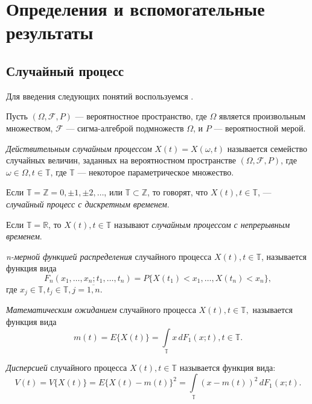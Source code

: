 \newpage
\chapter{Определения и вспомогательные результаты}
\label{c:definitions}

\section{Случайный процесс}

Для введения следующих понятий воспользуемся \cite{brillinjer-ts, trush-ts}.

Пусть $ (\Omega, \mathcal{F}, P) $ --- вероятностное пространство, где $\Omega$ является произвольным множеством, $\mathcal{F}$ --- сигма-алгеброй подмножеств $\Omega$, и $P$ --- вероятностной мерой.

\textit{Действительным случайным процессом} $ X(t) = X(\omega, t) $ называется семейство случайных величин, заданных на вероятностном пространстве $ (\Omega, \mathcal{F}, P) $, где $ \omega \in \Omega, t \in \mathbb{T}$, где $ \mathbb{T} $ --- некоторое параметрическое множество.

Если $ \mathbb{T} = \mathbb{Z} = {0, \pm 1, \pm 2, \dots} $, или $ \mathbb{T} \subset \mathbb{Z} $, то говорят, что $ X(t), t \in \mathbb{T} $, --- \textit{случайный процесс с дискретным временем}.

Если $ \mathbb{T} = \mathbb{R} $, то $ X(t), t \in \mathbb{T} $ называют \textit{случайным процессом с непрерывным временем}.

\textit{n-мерной функцией распределения} случайного процесса $ X(t), t \in \mathbb{T} $, называется функция вида
\begin{equation*}
	F_n(x_1, \dots, x_n; t_1, \dots, t_n) = P \{ X(t_1) < x_1, \dots, X(t_n) < x_n \},
\end{equation*}
где $ x_j \in \mathbb{T}, t_j \in \mathbb{T}, j = \overline{1,n} $.

\textit{Математическим ожиданием} случайного процесса $ X(t), t \in \mathbb{T}, $ называется функция вида
\begin{equation*}
	m(t) = E \{ X(t) \} = \int \limits_{\mathbb{T}} x \, dF_1(x;t), t \in \mathbb{T}.
\end{equation*}

\textit{Дисперсией} случайного процесса $ X(t), t \in \mathbb{T} $ называется функция вида:
\begin{equation*}
	V(t) = V \{ X(t) \} = E \{ X(t) - m(t) \}^2 = \int \limits_{\mathbb{T}} (x - m(t))^2 \, dF_1(x; t).
\end{equation*}

